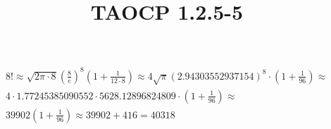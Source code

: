 \documentclass{article}
\title{TAOCP 1.2.5\mbox{-}5}
\begin{document}
\maketitle

\begin{multline*}
8! \approx \sqrt {2 \pi \cdot 8 }{(\frac{8}{e})}^{8} (1 + \frac{1}{12 \cdot 8 }) \approx 4 \sqrt{\pi} {(2.94303552937154)}^{8} \cdot (1 + \frac{1}{96}) \approx \\
4 \cdot 1.77245385090552 \cdot 5628.12896824809 \cdot (1 + \frac{1}{96}) \approx \\
39902 (1 + \frac{1}{96}) \approx 39902 + 416 = 40318
\end{multline*}
\end{document}
